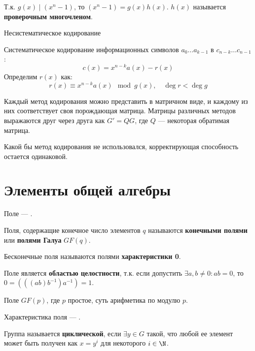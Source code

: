\begin{definition}
    Т.к. \(g(x) \mid (x^n - 1)\), то \((x^n - 1) = g(x)h(x)\).
    \(h(x)\) называется \textbf{проверочным многочленом}.
\end{definition}

Несистематическое кодирование \unfinished

\begin{definition}
    Систематическое кодирование информационных символов
    \(a_0 \dots a_{k-1}\) в \(c_{n-k} \dots c_{n-1}\):
    \[c(x) = x^{n - k} a(x) - r(x)\]
    Определим \(r(x)\) как:
    \[r(x) \equiv x^{n - k} a(x) \mod g(x), \quad \deg r < \deg g\]
\end{definition}

Каждый метод кодирования можно представить в матричном виде,
и каждому из них соответствует своя порождающая матрица.
Матрицы различных методов выражаются друг через друга как \(G' = QG\),
где \(Q\) --- некоторая обратимая матрица.

Какой бы метод кодирования не использовался, корректирующая способность остается одинаковой.

\section{Элементы общей алгебры}

\begin{definition}
    Поле --- \unfinished.
\end{definition}

\begin{definition}
    Поля, содержащие конечное число элементов \(q\) называются
    \textbf{конечными полями} или \textbf{полями Галуа} \(GF(q)\).
\end{definition}

\begin{definition}
    Бесконечные поля называются полями \textbf{характеристики 0}.
\end{definition}

\begin{definition}
    Поле является \textbf{областью целостности}, т.к. если допустить
    \(\exists a, b \neq 0 : ab = 0\), то \(0 = (((ab)b^{-1})a^{-1}) = 1\).
\end{definition}

Поле \(GF(p)\), где \(p\) простое, суть арифметика по модулю \(p\).

Характеристика поля --- \unfinished.

\begin{definition}
    Группа называется \textbf{циклической}, если \(\exists y \in G\) такой,
    что любой ее элемент может быть получен как \(x = y^i\)
    для некоторого \(i \in \N\). 
\end{definition}

